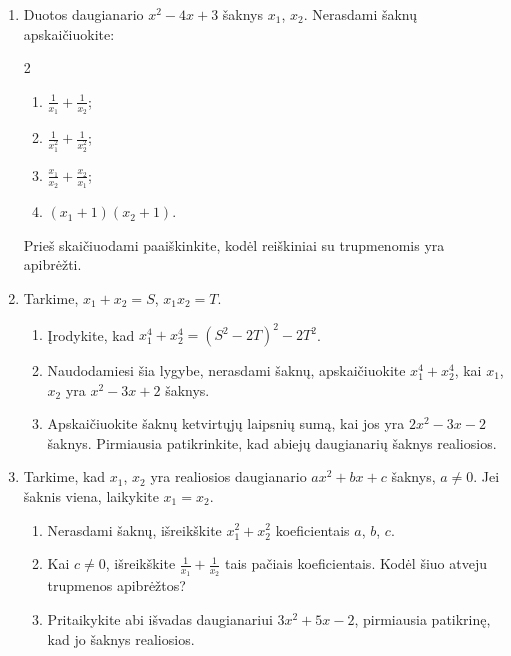 \documentclass[12pt,a4paper]{article}
\begin{document}
\begin{enumerate}[series=uzdaviniai]
\begin{multicols}{2}\begin{enumerate}
\item $x^2-5x+6$; \item $x^2+x-6$; \item $2x^2-3x-2$; \item $x^2-4x+4$.
\end{enumerate}\end{multicols}
Pasinaudokite \ref{simetrines-tapatybes} uždavinyje įrodyta kubų sumos lygybe.
\item Duotos daugianario $x^2-4x+3$ šaknys $x_1$, $x_2$. Nerasdami šaknų apskaičiuokite:
\begin{multicols}{2}\begin{enumerate}
\item $\frac{1}{x_1}+\frac{1}{x_2}$; \item $\frac{1}{x_1^2}+\frac{1}{x_2^2}$; \item $\frac{x_1}{x_2}+\frac{x_2}{x_1}$; \item $(x_1+1)(x_2+1)$.
\end{enumerate}\end{multicols}
Prieš skaičiuodami paaiškinkite, kodėl reiškiniai su trupmenomis yra apibrėžti.
\item Tarkime, $x_1+x_2=S$, $x_1x_2=T$.
\begin{enumerate}
\item Įrodykite, kad $x_1^4+x_2^4=(S^2-2T)^2-2T^2$.
\item Naudodamiesi šia lygybe, nerasdami šaknų, apskaičiuokite $x_1^4+x_2^4$, kai $x_1$, $x_2$ yra $x^2-3x+2$ šaknys.
\item Apskaičiuokite šaknų ketvirtųjų laipsnių sumą, kai jos yra $2x^2-3x-2$ šaknys. Pirmiausia patikrinkite, kad abiejų daugianarių šaknys realiosios.
\end{enumerate}
\item Tarkime, kad $x_1$, $x_2$ yra realiosios daugianario $ax^2+bx+c$ šaknys, $a\ne0$. Jei šaknis viena, laikykite $x_1=x_2$.
\begin{enumerate}
\item Nerasdami šaknų, išreikškite $x_1^2+x_2^2$ koeficientais $a$, $b$, $c$.
\item Kai $c\ne0$, išreikškite $\frac{1}{x_1}+\frac{1}{x_2}$ tais pačiais koeficientais. Kodėl šiuo atveju trupmenos apibrėžtos?
\item Pritaikykite abi išvadas daugianariui $3x^2+5x-2$, pirmiausia patikrinę, kad jo šaknys realiosios.
\end{enumerate}

\end{enumerate}
\end{document}
